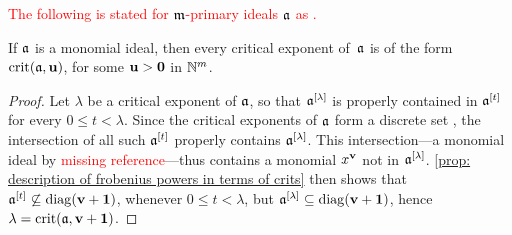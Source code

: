 \documentclass{amsart}
\begin{document}
{\textcolor{red}{The following is stated for $\mathfrak{m}$-primary ideals $\mathfrak{a}$ as \cite[Proposition 2.6]{hernandez+etal.frobenius_examples}.}

\begin{corollary}
   \label{cor: every crit is crit wrt diagonal ideal}
   If $\mathfrak{a}$ is a monomial ideal, then every critical exponent of~$\mathfrak{a}$ is of the form $\operatorname{crit}(\mathfrak{a},\mathbf{u})$, for some $\mathbf{u} > \mathbf{0}$ in $\mathbb{N}^m$.
\end{corollary}

\begin{proof}
   Let $\lambda$ be a critical exponent of $\mathfrak{a}$, so that $\mathfrak{a}^{[\lambda]}$ is properly contained in $\mathfrak{a}^{[t]}$ for every $0 \le t <\lambda$.
   Since the critical exponents of $\mathfrak{a}$ form a discrete set \cite[Corollary~5.8]{hernandez+etal.frobenius_powers}, the intersection of all such $\mathfrak{a}^{[t]}$ properly contains $\mathfrak{a}^{[\lambda]}$.
   This intersection---a monomial ideal by \textcolor{red}{missing reference}---thus contains a monomial $x^{\mathbf{v}}$ not in $\mathfrak{a}^{[\lambda]}$.
   \cref{prop: description of frobenius powers in terms of crits} then shows that $\mathfrak{a}^{[t]}\not\subseteq \operatorname{diag}(\mathbf{v}+\mathbf{1})$, whenever $0\le t < \lambda$, but $\mathfrak{a}^{[\lambda]} \subseteq \operatorname{diag}(\mathbf{v}+\mathbf{1})$, hence $\lambda = \operatorname{crit}(\mathfrak{a},\mathbf{v}+\mathbf{1})$.
\end{proof}


}
\end{document}
